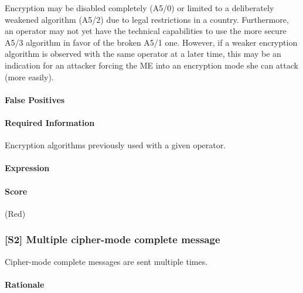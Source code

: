 \documentclass[a4paper,11pt,notitlepage,bigheadings,oneside]{scrartcl}
\begin{document}
Encryption may be disabled completely (A5/0) or limited to a deliberately
weakened algorithm (A5/2) due to legal restrictions in a country. Furthermore,
an operator may not yet have the technical capabilities to use the more secure
A5/3 algorithm in favor of the broken A5/1 one. However, if a weaker encryption
algorithm is observed with the same operator at a later time, this may be an
indication for an attacker forcing the ME into an encryption mode she can
attack (more easily).

\paragraph{False Positives}

\TBD


\paragraph{Required Information}

Encryption algorithms previously used with a given operator.


\paragraph{Expression}

\TBD

\paragraph{Score}

\TBD{} (Red)


\subsubsection{[S2] Multiple cipher-mode complete message}

Cipher-mode complete messages are sent multiple times.

\paragraph{Rationale}

\TBD
\end{document}
